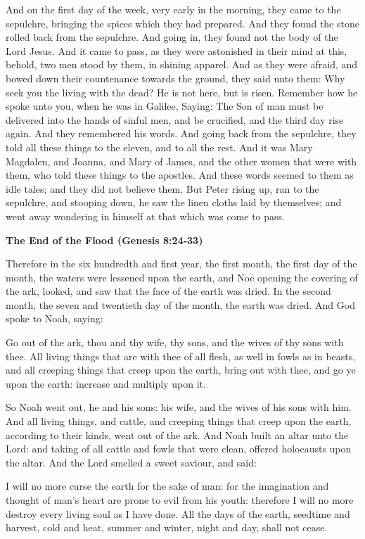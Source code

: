 And on the first day of the week, very early in the morning, they came to the sepulchre, bringing the spices which they had prepared. And they found the stone rolled back from the sepulchre. And going in, they found not the body of the Lord Jesus. And it came to pass, as they were astonished in their mind at this, behold, two men stood by them, in shining apparel. And as they were afraid, and bowed down their countenance towards the ground, they said unto them: Why seek you the living with the dead? He is not here, but is risen. Remember how he spoke unto you, when he was in Galilee, Saying: The Son of man must be delivered into the hands of sinful men, and be crucified, and the third day rise again. And they remembered his words. And going back from the sepulchre, they told all these things to the eleven, and to all the rest. And it was Mary Magdalen, and Joanna, and Mary of James, and the other women that were with them, who told these things to the apostles. And these words seemed to them as idle tales; and they did not believe them. But Peter rising up, ran to the sepulchre, and stooping down, he saw the linen cloths laid by themselves; and went away wondering in himself at that which was come to pass.

\textbf{The End of the Flood (Genesis 8:24-33)}

Therefore in the six hundredth and first year, the first month, the first day of the month, the waters were lessened upon the earth, and Noe opening the covering of the ark, looked, and saw that the face of the earth was dried. In the second month, the seven and twentieth day of the month, the earth was dried. And God spoke to Noah, saying:

Go out of the ark, thou and thy wife, thy sons, and the wives of thy sons with thee. All living things that are with thee of all flesh, as well in fowls as in beasts, and all creeping things that creep upon the earth, bring out with thee, and go ye upon the earth: increase and multiply upon it.

So Noah went out, he and his sons: his wife, and the wives of his sons with him. And all living things, and cattle, and creeping things that creep upon the earth, according to their kinds, went out of the ark. And Noah built an altar unto the Lord: and taking of all cattle and fowls that were clean, offered holocausts upon the altar. And the Lord smelled a sweet saviour, and said:

I will no more curse the earth for the sake of man: for the imagination and thought of man's heart are prone to evil from his youth: therefore I will no more destroy every living soul as I have done. All the days of the earth, seedtime and harvest, cold and heat, summer and winter, night and day, shall not cease.


